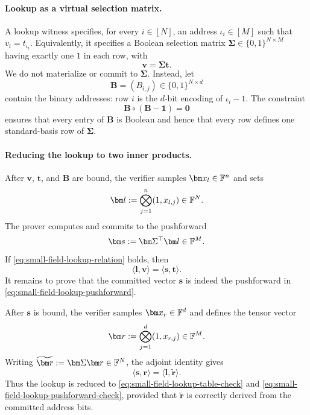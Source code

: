 \documentclass[runningheads]{llncs}
\begin{document}
\paragraph{Lookup as a virtual selection matrix.}
A lookup witness specifies, for every \(i\in[N]\), an address
\(\iota_i\in[M]\) such that \(v_i=t_{\iota_i}\).  Equivalently, it
specifies a Boolean selection matrix
\(\bm\Sigma\in\{0,1\}^{N\times M}\) having exactly one \(1\) in
each row, with
\begin{equation}
    \bm v=\bm\Sigma\bm t.
\label{eq:small-field-lookup-relation}
\end{equation}
We do not materialize or commit to \(\bm\Sigma\).  Instead, let
\[
    \bm B=(B_{i,j})
      \in\{0,1\}^{N\times d}
\]
contain the binary addresses: row \(i\) is the \(d\)-bit encoding of
\(\iota_i-1\).  The constraint
\begin{equation}
    \bm B\circ(\bm B-\bm1)=\bm0
\label{eq:small-field-lookup-booleanity}
\end{equation}
ensures that every entry of \(\bm B\) is Boolean and hence that every
row defines one standard-basis row of \(\bm\Sigma\).

\paragraph{Reducing the lookup to two inner products.}
After \(\bm v\), \(\bm t\), and \(\bm B\) are bound, the verifier
samples \(\bm x_l\in\Field^n\) and sets
\[
    \bm l
      :=\bigotimes_{j=1}^{n}(1,x_{l,j})
      \in\Field^N.
\]
The prover computes and commits to the pushforward
\begin{equation}
    \bm s:=\bm\Sigma^\top\bm l\in\Field^M.
\label{eq:small-field-lookup-pushforward}
\end{equation}
If \eqref{eq:small-field-lookup-relation} holds, then
\begin{equation}
    \boxed{
    \langle\bm l,\bm v\rangle
      =\langle\bm s,\bm t\rangle.}
\label{eq:small-field-lookup-table-check}
\end{equation}
It remains to prove that the committed vector \(\bm s\) is indeed the
pushforward in \eqref{eq:small-field-lookup-pushforward}.

After \(\bm s\) is bound, the verifier samples
\(\bm x_r\in\Field^d\) and defines the tensor vector
\begin{equation}
    \bm r
      :=\bigotimes_{j=1}^{d}(1,x_{r,j})
      \in\Field^M.
\label{eq:small-field-lookup-right-tensor}
\end{equation}
Writing
\(\widetilde{\bm r}:=\bm\Sigma\bm r\in\Field^N\), the adjoint
identity gives
\begin{equation}
    \boxed{
    \langle\bm s,\bm r\rangle
      =\langle\bm l,\widetilde{\bm r}\rangle.}
\label{eq:small-field-lookup-pushforward-check}
\end{equation}
Thus the lookup is reduced to
\eqref{eq:small-field-lookup-table-check} and
\eqref{eq:small-field-lookup-pushforward-check}, provided that
\(\widetilde{\bm r}\) is correctly derived from the committed address
bits.
\end{document}
